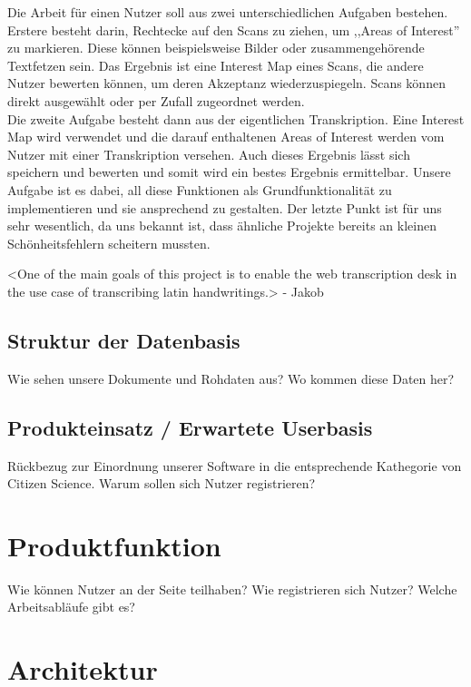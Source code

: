 \documentclass{article}
\begin{document}
Die Arbeit für einen Nutzer soll aus zwei unterschiedlichen Aufgaben bestehen. Erstere besteht darin, Rechtecke auf den Scans zu ziehen, um ,,Areas of Interest'' zu markieren. Diese können beispielsweise Bilder oder zusammengehörende Textfetzen sein. Das Ergebnis ist eine Interest Map eines Scans, die andere Nutzer bewerten können, um deren Akzeptanz wiederzuspiegeln. Scans können direkt ausgewählt oder per Zufall zugeordnet werden. \\
Die zweite Aufgabe besteht dann aus der eigentlichen Transkription. Eine Interest Map wird verwendet und die darauf enthaltenen Areas of Interest werden vom Nutzer mit einer Transkription versehen. Auch dieses Ergebnis lässt sich speichern und bewerten und somit wird ein bestes Ergebnis ermittelbar. Unsere Aufgabe ist es dabei, all diese Funktionen als Grundfunktionalität zu implementieren und sie ansprechend zu gestalten. Der letzte Punkt ist für uns sehr wesentlich, da uns bekannt ist, dass ähnliche Projekte bereits an kleinen Schönheitsfehlern scheitern mussten.

<One of the main goals of this project is to enable the web transcription desk in the use case of transcribing latin handwritings.> - Jakob


\subsection{Struktur der Datenbasis}
Wie sehen unsere Dokumente und Rohdaten aus?
Wo kommen diese Daten her?

\subsection{Produkteinsatz / Erwartete Userbasis}
Rückbezug zur Einordnung unserer Software in die entsprechende Kathegorie von Citizen Science.
Warum sollen sich Nutzer registrieren?

\section{Produktfunktion}
Wie können Nutzer an der Seite teilhaben?
Wie registrieren sich Nutzer?
Welche Arbeitsabläufe gibt es?

\section{Architektur}
\end{document}
